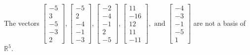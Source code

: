 \begin{exercise}
\begin{exerciseStatement}
  \end{exerciseStatement}
  \begin{exerciseAnswer}
   The vectors \(\left[\begin{array}{r}
-5 \\
3 \\
-5 \\
-3 \\
2
\end{array}\right] , \left[\begin{array}{r}
-5 \\
2 \\
-4 \\
-1 \\
-3
\end{array}\right] , \left[\begin{array}{r}
-2 \\
-4 \\
-1 \\
2 \\
-5
\end{array}\right] , \left[\begin{array}{r}
11 \\
-16 \\
12 \\
11 \\
-11
\end{array}\right] , \text{ and } \left[\begin{array}{r}
-4 \\
-3 \\
-1 \\
-5 \\
1
\end{array}\right]\) 
  	 are not  a basis of \(\mathbb{R}^5\).
  


  \end{exerciseAnswer}
\end{exercise}